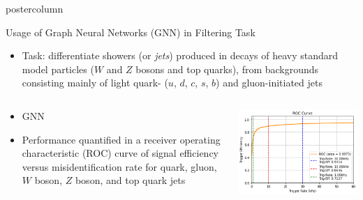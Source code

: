 \documentclass[final,hyperref={pdfpagelabels=false}]{beamer}
\begin{document}
\begin{frame}
\begin{columns}
\begin{column}{.49\textwidth}
\begin{beamercolorbox}[center,wd=\textwidth]{postercolumn}
\begin{minipage}[T]{.95\textwidth}
{            \begin{block}{Usage of Graph Neural Networks (GNN) in Filtering Task}
              \begin{itemize}
              \item Task: differentiate showers (or \emph{jets})
                produced in decays of heavy standard model
                particles ($W$ and $Z$ bosons and top quarks),
                from backgrounds consisting mainly of light quark-
                ($u$, $d$, $c$, $s$, $b$) and gluon-initiated jets 
                \end{itemize}
              \begin{columns}              
              \begin{column}{.49\textwidth}
                \begin{itemize}
              \item GNN
              \item Performance quantified in a receiver operating
                characteristic (ROC) curve of signal efficiency versus
                misidentification rate for quark, gluon, $W$ boson,
                $Z$ boson, and top quark jets
              \end{itemize}
            \end{column}
            \begin{column}{.49\textwidth}
             \begin{center}
                    \includegraphics[width=\linewidth]{gnn_roc.png}
                  \end{center}
                \end{column}
                \end{columns}

\end{block}}
\end{minipage}
\end{beamercolorbox}
\end{column}
\end{columns}
\end{frame}
\end{document}
